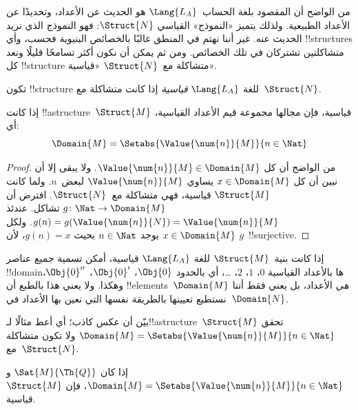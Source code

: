 \documentclass[../../../include/open-logic-section]{subfiles}
\begin{document}

من الواضح أن المقصود بلغة الحساب~$\Lang{L_A}$ هو الحديث عن الأعداد،
وتحديدًا عن الأعداد الطبيعية. ولذلك يتميز «النموذج» القياسي
$\Struct{N}$: فهو النموذج الذي نريد الحديث عنه. غير أننا نهتم في المنطق
غالبًا بالخصائص البنيوية فحسب، وأي !!{structure}s متشاكلتين تشتركان في
تلك الخصائص. ومن ثم يمكن أن نكون أكثر تسامحًا قليلًا ونعد كل
!!{structure} متشاكلة مع~$\Struct{N}$ «قياسية».

\begin{defn}
تكون !!{structure} للغة $\Lang{L_A}$ \emph{قياسية} إذا كانت متشاكلة
مع~$\Struct{N}$.
\end{defn}

\begin{prop}
 إذا كانت !!a{structure}~$\Struct{M}$
قياسية، فإن مجالها مجموعة قيم الأعداد القياسية، أي:
\[
\Domain{M} = \Setabs{\Value{\num{n}}{M}}{n \in \Nat}
\]
\end{prop}

\begin{proof}
من الواضح أن كل $\Value{\num{n}}{M} \in \Domain{M}$. ولا يبقى إلا أن
نبين أن كل $x \in \Domain{M}$ يساوي $\Value{\num{n}}{M}$ لبعض~$n$.
ولما كانت $\Struct{M}$ قياسية، فهي متشاكلة مع~$\Struct{N}$. افترض أن
$g\colon \Nat \to \Domain{M}$ تشاكل. عندئذ
$g(n) = g(\Value{\num{n}}{N}) = \Value{\num{n}}{M}$. ولكل
$x \in \Domain{M}$ يوجد $n \in \Nat$ بحيث $g(n)=x$، لأن $g$~!!{surjective}.
\end{proof}

\begin{explain}
إذا كانت بنية~$\Struct{M}$ للغة $\Lang{L_A}$ قياسية، أمكن تسمية جميع
عناصر !!{domain}ها بالأعداد القياسية $\num{0}$، $\num{1}$، $\num{2}$،
\dots، أي بالحدود $\Obj{0}$، $\Obj{0}'$، $\Obj{0}''$، وهكذا. ولا يعني
هذا بالطبع أن !!{element}s~$\Domain{M}$ \emph{هي} الأعداد، بل يعني فقط
أننا نستطيع تعيينها بالطريقة نفسها التي نعين بها الأعداد في~$\Domain{N}$.
\end{explain}

\begin{prob}
بيّن أن عكس  كاذب؛ أي أعط
مثالًا لـ!!a{structure}~$\Struct{M}$ تحقق
$\Domain{M} = \Setabs{\Value{\num{n}}{M}}{n \in \Nat}$ ولا تكون
متشاكلة مع~$\Struct{N}$.
\end{prob}

\begin{prop}
إذا كان $\Sat{M}{\Th{Q}}$ و
$\Domain{M} = \Setabs{\Value{\num{n}}{M}}{n \in \Nat}$، فإن
$\Struct{M}$ قياسية.
\end{prop}
\end{document}
